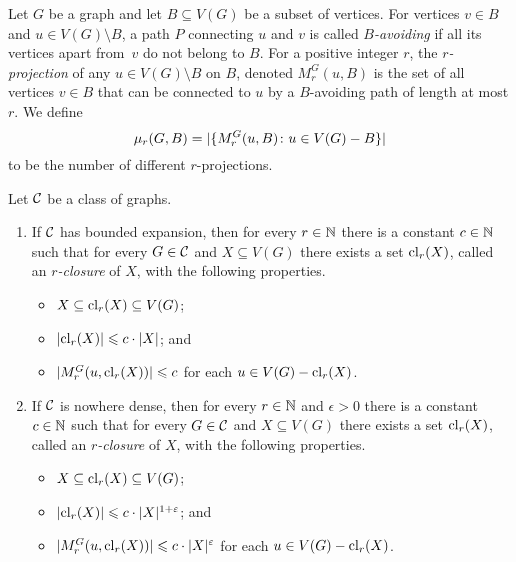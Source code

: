 Let $G$ be a graph and let $B\subseteq V(G)$ be a subset of vertices. For vertices $v\in B$ and $u\in V(G)\setminus B$, a path $P$ connecting $u$ and $v$ is called {\em{$B$-avoiding}}
if all its vertices apart from~$v$ do not belong to $B$. For a positive integer $r$, the {\em{$r$-projection}} of any $u\in V(G)\setminus B$ on $B$, denoted $M^G_r(u,B)$ is the set of all vertices $v\in B$ that
can be connected to $u$ by a $B$-avoiding path of length at most $r$. 
%
%
We define 
\[\mu_r(G,B)=|\{M_r^G(u,B)\colon u\in V(G)- B\}|\]
to be the number of different $r$-projections.

\begin{lemma}\label{lem:closure}
Let $\mathcal{C}$ be a class of graphs. 
\begin{enumerate}
\item If $\mathcal{C}$ has bounded expansion, then for every $r\in \mathbb{N}$ there is a constant $c\in \mathbb{N}$ such that for
every $G\in \mathcal{C}$ and $X\subseteq V(G)$ there exists a set $\mathrm{cl}_r(X)$, called an {\em{$r$-closure}} of $X$, with the following properties. 
\begin{itemize}
  \item $X\subseteq \mathrm{cl}_r(X)\subseteq V(G)$;
  \item $|\mathrm{cl}_r(X)|\leqslant c\cdot |X|$; and
  \item $|M_r^G(u,\mathrm{cl}_r(X))|\leqslant c$ for each $u\in V(G)- \mathrm{cl}_r(X)$.
\end{itemize}
\item If $\mathcal{C}$ is nowhere dense, then for every $r\in\mathbb{N}$ and $\epsilon>0$ there is a 
constant $c\in\mathbb{N}$ such that for every $G\in \mathcal{C}$ and $X\subseteq V(G)$ there exists a set 
$\mathrm{cl}_r(X)$,  called an {\em{$r$-closure}} of $X$, 
with the following properties. 
\begin{itemize}
  \item $X\subseteq \mathrm{cl}_r(X)\subseteq V(G)$;
  \item $|\mathrm{cl}_r(X)|\leqslant c\cdot |X|^{1+\varepsilon}$; and
  \item $|M_r^G(u,\mathrm{cl}_r(X))|\leqslant c\cdot |X|^{\varepsilon}$ for each $u\in V(G)- \mathrm{cl}_r(X)$.
\end{itemize}
\end{enumerate}
\end{lemma}

